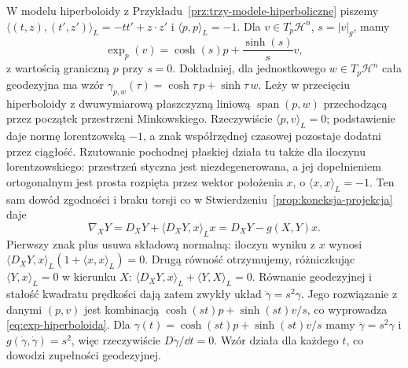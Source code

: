 \begin{przyklad}
W modelu hiperboloidy z
Przykładu~\ref{prz:trzy-modele-hiperboliczne}
piszemy $\langle(t,z),(t',z')\rangle_L
=-tt'+z\cdot z'$ i $\langle p,p\rangle_L=-1$.
Dla $v\in T_p\mathcal H^n$, $s=|v|_g$, mamy
\begin{equation}\label{eq:exp-hiperboloida}
 \exp_p(v)=\cosh(s)p+\frac{\sinh(s)}{s}v,
\end{equation}
z wartością graniczną $p$ przy $s=0$.
Dokładniej, dla jednostkowego $w\in T_p\mathcal H^n$
cała geodezyjna ma wzór
$\gamma_{p,w}(\tau)=\cosh\tau\,p+\sinh\tau\,w$.
Leży w przecięciu hiperboloidy z dwuwymiarową
płaszczyzną liniową $\operatorname{span}(p,w)$
przechodzącą przez początek przestrzeni Minkowskiego.
Rzeczywiście $\langle p,v\rangle_L=0$;
podstawienie daje normę lorentzowską $-1$,
a znak współrzędnej czasowej pozostaje dodatni przez ciągłość.
Rzutowanie pochodnej płaskiej działa tu także dla iloczynu
lorentzowskiego: przestrzeń styczna jest niezdegenerowana,
a jej dopełnieniem ortogonalnym jest prosta rozpięta przez
wektor położenia $x$, o $\langle x,x\rangle_L=-1$.
Ten sam dowód zgodności i braku torsji co w
Stwierdzeniu~\ref{prop:koneksja-projekcja} daje
\[
 \nabla_XY=D_XY+\langle D_XY,x\rangle_Lx
          =D_XY-g(X,Y)x.
\]
Pierwszy znak plus usuwa składową normalną:
iloczyn wyniku z $x$ wynosi
$\langle D_XY,x\rangle_L(1+\langle x,x\rangle_L)=0$.
Drugą równość otrzymujemy, różniczkując
$\langle Y,x\rangle_L=0$ w kierunku $X$:
$\langle D_XY,x\rangle_L+\langle Y,X\rangle_L=0$.
Równanie geodezyjnej i stałość kwadratu prędkości
dają zatem zwykły układ $\ddot\gamma=s^2\gamma$.
Jego rozwiązanie z danymi $(p,v)$ jest kombinacją
$\cosh(st)p+\sinh(st)v/s$, co wyprowadza
\eqref{eq:exp-hiperboloida}.
Dla $\gamma(t)=\cosh(st)p+\sinh(st)v/s$ mamy
$\ddot\gamma=s^2\gamma$ i $g(\dot\gamma,\dot\gamma)=s^2$,
więc rzeczywiście $D\dot\gamma/\dd t=0$.
Wzór działa dla każdego $t$, co dowodzi zupełności geodezyjnej.


\end{przyklad}
